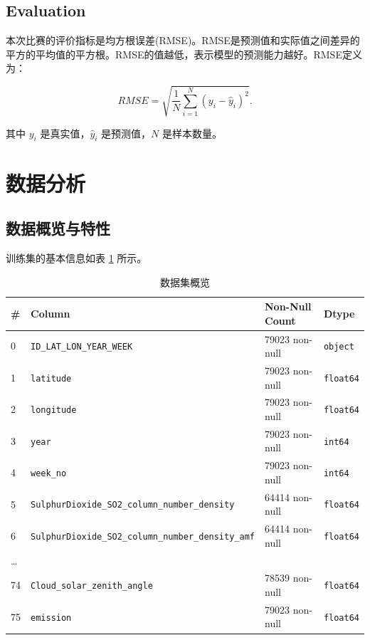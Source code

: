 \documentclass{ctexart}
\begin{document}
\begin{sloppypar}
\subsection{Evaluation}

本次比赛的评价指标是均方根误差(RMSE)。RMSE是预测值和实际值之间差异的平方的平均值的平方根。RMSE的值越低，表示模型的预测能力越好。RMSE定义为：

\[
      RMSE=\sqrt{\frac{1}{N}\sum\limits_{i=1}^{N}(y_i-\hat y_i)^2}.
\]

其中 $y_i$ 是真实值，$\hat y_i$ 是预测值，$N$ 是样本数量。

\section{数据分析}

\subsection{数据概览与特性}

训练集的基本信息如表 \ref{tab:0} 所示。

\begin{table}[h]
      \centering
      \caption{数据集概览\label{tab:0}}
      \begin{tabular}{llll}
            \hline
            \#       & Column                                                     & Non-Null Count & Dtype            \\ \hline
            0        & \texttt{ID\_LAT\_LON\_YEAR\_WEEK}                          & 79023 non-null & \texttt{object}  \\
            1        & \texttt{latitude}                                          & 79023 non-null & \texttt{float64} \\
            2        & \texttt{longitude}                                         & 79023 non-null & \texttt{float64} \\
            3        & \texttt{year}                                              & 79023 non-null & \texttt{int64}   \\
            4        & \texttt{week\_no}                                          & 79023 non-null & \texttt{int64}   \\
            5        & \texttt{SulphurDioxide\_SO2\_column\_number\_density}      & 64414 non-null & \texttt{float64} \\
            6        & \texttt{SulphurDioxide\_SO2\_column\_number\_density\_amf} & 64414 non-null & \texttt{float64} \\
            \ldots{} &                                                            &                &                  \\
            74       & \texttt{Cloud\_solar\_zenith\_angle}                       & 78539 non-null & \texttt{float64} \\
            75       & \texttt{emission}                                          & 79023 non-null & \texttt{float64} \\
            \hline
      \end{tabular}
\end{table}


\end{sloppypar}
\end{document}
